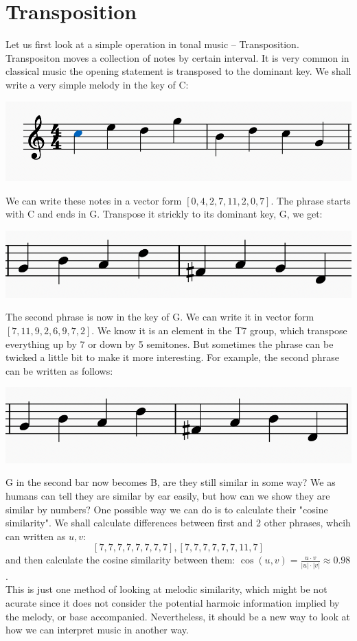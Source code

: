 \section*{Transposition}
Let us first look at a simple operation in tonal music -- Transposition. Transpositon moves a 
collection of notes by certain interval. It is very common in classical music the opening
statement is transposed to the dominant key. We shall
write a very simple melody in the key of C:

\begin{center}
    \includegraphics{1}
\end{center}

We can write these notes in a vector form $[0, 4, 2, 7, 11, 2, 0, 7]$. The phrase
starts with C and ends in G. Transpose it strickly to its dominant key, G, we get:
\begin{center}
    \includegraphics{2}
\end{center}
The second phrase is now in the key of G. We can write it in vector 
form $[7, 11, 9, 2, 6, 9, 7, 2]$. We know it is an element in the T7 group,
which transpose everything up by 7 or down by 5 semitones. But sometimes 
the phrase can be twicked a little bit to make it more interesting. For example,
the second phrase can be written as follows:
\begin{center}
    \includegraphics{3}
\end{center}
G in the second bar now becomes B, are they still similar in some way? 
We as humans can tell they are similar by ear easily, but how can we show they are 
similar by numbers? One possible way we can do is to calculate their "cosine similarity". 
We shall calculate differences between first and 2 other phrases, whcih can written as $u, v$:
\[[7,7,7,7,7,7,7,7], [7,7,7,7,7,7,11,7]\] and then calculate the cosine similarity between them:
$\cos(u, v) = \frac{u\cdot v}{|u|\cdot |v|}\approx0.98$.\\
This is just one method of looking at melodic similarity, which might be not acurate since
it does not consider the potential harmoic information implied by the melody, or base 
accompanied. Nevertheless, it should be a new way to look at how we can interpret music
in another way.

